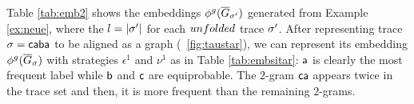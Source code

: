 \begin{example} %
Table \ref{tab:emb2} shows the embeddings ${\phi^{g}}(\overline{G}_{\sigma'})$ generated from Example \ref{ex:neue}, where the $l=|{\sigma'}|$ for each $unfolded$ trace ${\sigma'}$.
{After representing trace $\sigma=\mathsf{caba}$ to be aligned as a graph (\figurename~\ref{fig:taustar}), we can represent its}
embedding ${\phi^{g}}(\overline{G}_{\sigma})$ with strategies $\epsilon^1$ and $\nu^1$ %
{as} in Table \ref{tab:embsitar}: $\mathsf{a}$ is clearly the most frequent label while $\mathsf{b}$ and $\mathsf{c}$ are equiprobable. The $2$-gram $\mathsf{ca}$ appears twice in the trace set and then, it is more frequent than the remaining $2$-grams.
\end{example}

